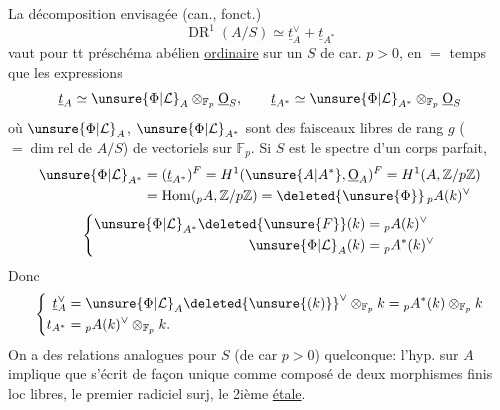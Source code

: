La décomposition envisagée (can., fonct.)
\[
\operatorname{DR}^1(A/S)\simeq\underline t_A^\vee+\underline t_{A^*}
\]
vaut pour tt préschéma abélien \uline{ordinaire} sur un $S$ de car. $p>0$, en $=$ temps que les expressions
\[
\underline t_A\simeq\unsure{\Phi|\mathcal L}_A\otimes_{\mathbb F_p}\underline{\mathrm O}_S,
\qquad \underline t_{A^*}\simeq\unsure{\Phi|\mathcal L}_{A^*}\otimes_{\mathbb F_p}\underline{\mathrm O}_S
\]
où $\unsure{\Phi|\mathcal L}_A$, $\unsure{\Phi|\mathcal L}_{A^*}$ sont des faisceaux    libres de rang $g$ ($=\dim\mathrm{rel}$ de $A/S$) de vectoriels sur $\mathbb F_p$. Si $S$ est le spectre d'un corps parfait,
\[
\begin{aligned}
\unsure{\Phi|\mathcal L}_{A^*}&=(\underline t_{A^*})^F
=H^1(\unsure{A|A^*},\underline{\mathrm O}_A)^F
=H^1(A,\mathbb Z/p\mathbb Z)\\
&=\operatorname{Hom}({}_pA,\mathbb Z/p\mathbb Z)
=\deleted{\unsure{\Phi}}\,{}_pA(k)^\vee
\end{aligned}
\]
\[
\left\{\begin{aligned}
\unsure{\Phi|\mathcal L}_{A^*}\deleted{\unsure{F}}(k)&={}_pA(k)^\vee\\
\unsure{\Phi|\mathcal L}_A(k)&={}_pA^*(k)^\vee
\end{aligned}\right.
\]
Donc
\[
\left\{\begin{aligned}
\underline t_A^\vee&=\unsure{\Phi|\mathcal L}_A\deleted{\unsure{(k)}}^\vee\otimes_{\mathbb F_p}k
={}_pA^*(k)\otimes_{\mathbb F_p}k\\
t_{A^*}&={}_pA(k)^\vee\otimes_{\mathbb F_p}k.
\end{aligned}\right.
\]
On a des relations analogues pour $S$ (de car $p>0$) quelconque: l'hyp. sur $A$ implique que
s'écrit de façon unique comme composé
de deux morphismes finis loc libres, le premier radiciel surj, le 2ième \uline{étale}.


